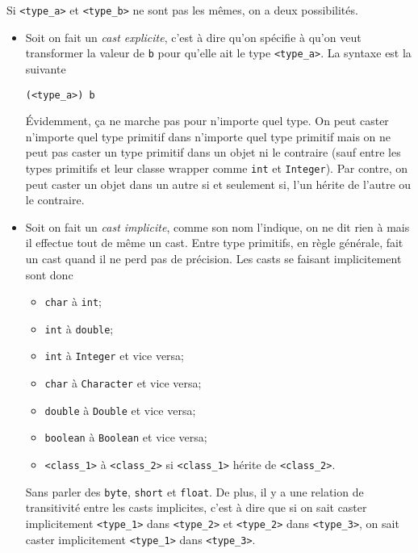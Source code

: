 Si \verb|<type_a>| et \verb|<type_b>| ne sont pas les mêmes, on a deux
possibilités.
\begin{itemize}
  \item Soit on fait un \emph{cast explicite}, c'est à dire qu'on
    spécifie à \java{} qu'on veut transformer la valeur de \verb|b| pour
    qu'elle ait le type \verb|<type_a>|. La syntaxe est la suivante
    \begin{lstlisting}
(<type_a>) b
    \end{lstlisting}
    Évidemment, ça ne marche pas pour n'importe quel type.
    On peut caster n'importe quel type primitif dans n'importe quel type
    primitif mais on ne peut pas caster un type primitif dans un objet ni
    le contraire (sauf entre les types primitifs et leur classe wrapper comme
    \verb|int| et \verb|Integer|).
    Par contre, on peut caster un objet dans un autre si et seulement si,
    l'un hérite de l'autre ou le contraire.
  \item Soit on fait un \emph{cast implicite}, comme son nom l'indique,
    on ne dit rien à \java{} mais il effectue tout de même un cast.
    Entre type primitifs, en règle générale,
    \java{} fait un cast quand il ne perd pas de précision.
    Les casts se faisant implicitement sont donc
    \begin{itemize}
      \item \verb|char| à \verb|int|;
      \item \verb|int| à \verb|double|;
      \item \verb|int| à \verb|Integer| et vice versa;
      \item \verb|char| à \verb|Character| et vice versa;
      \item \verb|double| à \verb|Double| et vice versa;
      \item \verb|boolean| à \verb|Boolean| et vice versa;
      \item \verb|<class_1>| à \verb|<class_2>| si \verb|<class_1>|
        hérite de \verb|<class_2>|.
    \end{itemize}
    Sans parler des \verb|byte|, \verb|short| et \verb|float|.
    De plus, il y a une relation de transitivité entre les casts
    implicites, c'est à dire que si on sait caster implicitement
    \verb|<type_1>| dans \verb|<type_2>| et
    \verb|<type_2>| dans \verb|<type_3>|, on sait caster implicitement
    \verb|<type_1>| dans \verb|<type_3>|.
\end{itemize}

